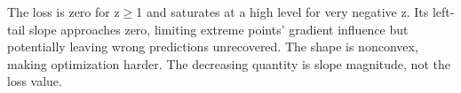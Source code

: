 The loss is zero for z\ensuremath{\ge}1 and saturates at a high level for very negative z. Its left-tail slope approaches zero, limiting extreme points’ gradient influence but potentially leaving wrong predictions unrecovered. The shape is nonconvex, making optimization harder. The decreasing quantity is slope magnitude, not the loss value.
